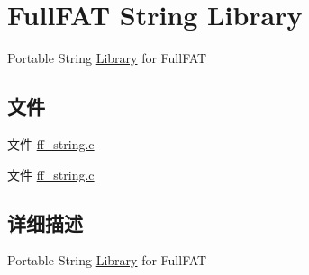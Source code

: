 \hypertarget{group___s_t_r_i_n_g}{}\section{Full\+F\+AT String Library}
\label{group___s_t_r_i_n_g}


Portable String \hyperlink{struct_library}{Library} for Full\+F\+AT  


\subsection*{文件}
\begin{DoxyCompactItemize}
\item 
文件 \hyperlink{ff__string_8c}{ff\+\_\+string.\+c}
\item 
文件 \hyperlink{ff__string_8c}{ff\+\_\+string.\+c}
\end{DoxyCompactItemize}


\subsection{详细描述}
Portable String \hyperlink{struct_library}{Library} for Full\+F\+AT 

